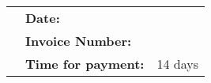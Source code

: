 \documentclass[onecolumn]{article} %
\begin{document}
\vspace{2cm}


\begin{multicols}{3}
\begin{flushleft}
\invoiceename\\
\invoiceefullname\\
\invoiceestreet\\
\invoiceezipcode~\invoiceecity\\
\invoiceecountry\\
\end{flushleft}


\columnbreak
\begin{flushleft}
\vfill
\end{flushleft}
\vspace{2cm}

\columnbreak
\begin{flushleft}
\vspace*{1cm}
\myfullname\\
\mystreet\\
\myzipcode~\mycity\\
\myphone\\

\ifx\mywebsite\undefined
\else
\href{\mywebsite}{\mywebsite}\\
\fi
\href{\myemail}{\myemail}\\
\end{flushleft}

\end{multicols}

\begin{flushright}
	\begin{longtable}{p{10cm}lr}
		\hfill & \textbf{Date:} & \invoicedate\\
		\hfill & \textbf{Invoice Number:} & \invoicenumber\\
		\hfill & \textbf{Time for payment:} & 14 days\\
	\end{longtable}
\end{flushright}
\end{document}
